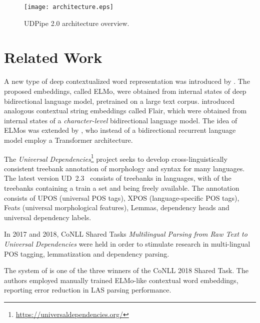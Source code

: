\documentclass[11pt,a4paper]{article}
\begin{document}
\begin{figure*}[t]
  \begin{center}
    \texttt{[image: architecture.eps]}
  \end{center}
  \caption{UDPipe 2.0 architecture overview.}
  \label{figure:udpipe}
\end{figure*}

\section{Related Work}
\label{section:related_work}

A new type of deep contextualized word representation was introduced by
\citet{Peters2018}. The proposed embeddings, called ELMo, were obtained from
internal states of deep bidirectional language model, pretrained on a large
text corpus. \citet{Akbik} introduced analogous contextual string
embeddings called Flair, which were obtained from internal states of
a \emph{character-level} bidirectional language model. The idea of ELMos was
extended by \citet{BERT}, who instead of a bidirectional recurrent language
model employ a Transformer \citep{vaswani:2017} architecture.

The \emph{Universal
Dependencies}\footnote{\scriptsize\url{https://universaldependencies.org/}}
project \citep{ud} seeks to develop cross-linguistically consistent treebank
annotation of morphology and syntax for many languages.  The latest version
UD~2.3~\citep{ud23} consists of  treebanks in  languages,
with  of the treebanks containing a train a set and being freely available.
The annotation consists of UPOS (universal POS tags), XPOS (language-specific
POS tags), Feats (universal morphological features), Lemmas, dependency heads
and universal dependency labels.

In 2017 and 2018, CoNLL Shared Tasks \emph{Multilingual Parsing from Raw Text
to Universal Dependencies} \cite{CoNLL2017,CoNLL2018} were held in order to
stimulate research in multi-lingual POS tagging, lemmatization and dependency
parsing.

The system of \citet{udst18:harbin} is one of the three winners of the CoNLL
2018 Shared Task. The authors employed manually trained ELMo-like contextual
word embeddings, reporting  error reduction in LAS parsing performance.
\end{document}
